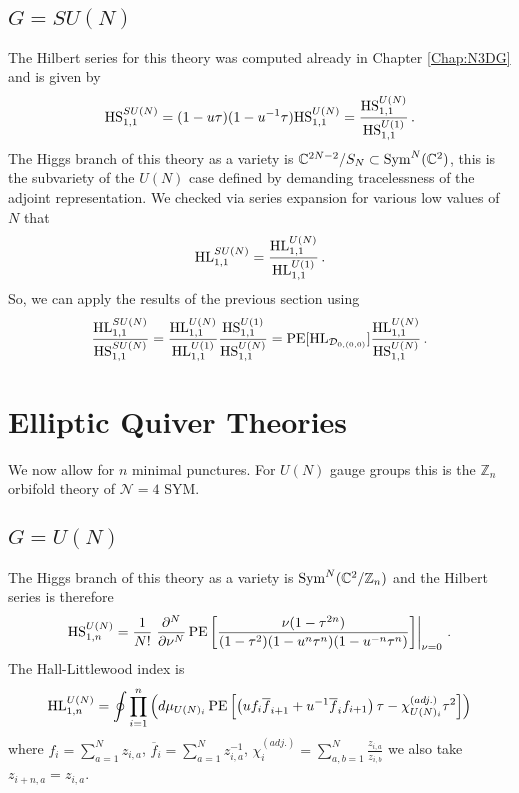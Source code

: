\documentclass[main.tex]{subfiles}
\begin{document}
\subsection{\texorpdfstring{$G=SU(N)$}{G=SU(N)}}
The Hilbert series for this theory was computed already in Chapter \ref{Chap:N3DG} and is given by
\begin{equation}
\textrm{HS}^{SU(N)}_{1,1}=(1-u\tau)(1-u^{-1}\tau)\textrm{HS}^{U(N)}_{1,1}=\frac{\textrm{HS}^{U(N)}_{1,1}}{\textrm{HS}^{U(1)}_{1,1}}\,.
\end{equation}
The Higgs branch of this theory as a variety is $\mathbb{C}^{2N-2}/S_N\subset\operatorname{Sym}^N(\mathbb{C}^2)$, this is the subvariety of the $U(N)$ case defined by demanding tracelessness of the adjoint representation.
We checked via series expansion for various low values of $N$ that
\begin{equation}
\textrm{HL}^{SU(N)}_{1,1}=\frac{\textrm{HL}^{U(N)}_{1,1}}{\textrm{HL}^{U(1)}_{1,1}}\,.
\end{equation}
So, we can apply the results of the previous section using
\begin{equation}
\frac{\textrm{HL}^{SU(N)}_{1,1}}{\textrm{HS}^{SU(N)}_{1,1}}=\frac{\textrm{HL}^{U(N)}_{1,1}}{\textrm{HL}^{U(1)}_{1,1}}\frac{\textrm{HS}^{U(1)}_{1,1}}{\textrm{HS}^{U(N)}_{1,1}}=\operatorname{\mathrm{PE}}[\textrm{HL}_{\mathcal{D}_{0,(0,0)}}]\frac{\textrm{HL}^{U(N)}_{1,1}}{\textrm{HS}^{U(N)}_{1,1}}\,.
\end{equation}

\section{Elliptic Quiver Theories}
We now allow for $n$ minimal punctures. For $U(N)$ gauge groups this is the $\mathbb{Z}_n$ orbifold theory of $\mathcal{N}=4$ SYM.
\subsection{\texorpdfstring{$G=U(N)$}{G=U(N)}}
The Higgs branch of this theory as a variety is $\operatorname{Sym}^N(\mathbb{C}^2/\mathbb{Z}_n)$ and the Hilbert series is therefore
\begin{equation}
\textrm{HS}^{U(N)}_{1,n}=\frac{1}{N!}\left.\frac{\partial^N}{\partial\nu^N}\operatorname{\mathrm{PE}}\left[\frac{\nu(1-\tau^{2n})}{(1-\tau^2)(1-u^n\tau^n)(1-u^{-n}\tau^n)}\right]\right|_{\nu=0}\,.
\end{equation}
The Hall-Littlewood index is
\begin{equation}
\textrm{HL}^{U(N)}_{1,n}=\oint \prod_{i=1}^n\left(d\mu_{U(N)_i}\operatorname{\mathrm{PE}}\left[\left(uf_i\overline{f}_{i+1}+u^{-1}\overline{f}_if_{i+1}\right)\tau-\chi^{(adj.)}_{U(N)_i}\tau^2\right]\right)
\end{equation}
where 
$f_i=\sum_{a=1}^Nz_{i,a}$, $\overline{f}_i=\sum_{a=1}^Nz^{-1}_{i,a}$, $\chi^{(adj.)}_i=\sum_{a,b=1}^N\frac{z_{i,a}}{z_{i,b}}$ we also take $z_{i+n,a}= z_{i,a}$.
\end{document}
